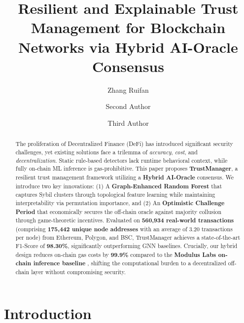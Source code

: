 \documentclass[runningheads]{llncs}
\begin{document}
\title{Resilient and Explainable Trust Management for Blockchain Networks via Hybrid AI-Oracle Consensus}

\author{Zhang Ruifan \and
Second Author \and
Third Author}



\maketitle

\begin{abstract}
The proliferation of Decentralized Finance (DeFi) has introduced significant security challenges, yet existing solutions face a trilemma of \textit{accuracy}, \textit{cost}, and \textit{decentralization}. Static rule-based detectors lack runtime behavioral context, while fully on-chain ML inference is gas-prohibitive. This paper proposes \textbf{TrustManager}, a resilient trust management framework utilizing a \textbf{Hybrid AI-Oracle} consensus. We introduce two key innovations: (1) A \textbf{Graph-Enhanced Random Forest} that captures Sybil clusters through topological feature learning while maintaining interpretability via permutation importance, and (2) An \textbf{Optimistic Challenge Period} that economically secures the off-chain oracle against majority collusion through game-theoretic incentives. Evaluated on \textbf{560,934 real-world transactions} (comprising \textbf{175,442 unique node addresses} with an average of 3.20 transactions per node) from Ethereum, Polygon, and BSC, TrustManager achieves a state-of-the-art F1-Score of \textbf{98.30\%}, significantly outperforming GNN baselines. Crucially, our hybrid design reduces on-chain gas costs by \textbf{99.9\%} compared to the \textbf{Modulus Labs on-chain inference baseline} \cite{modulus2023cost}, shifting the computational burden to a decentralized off-chain layer without compromising security.
\end{abstract}

\section{Introduction}
\end{document}
